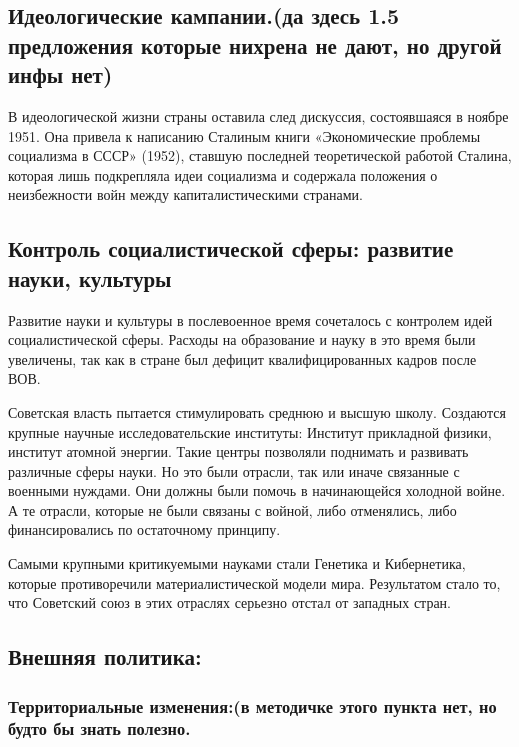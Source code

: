 \subsection{Идеологические кампании.(да здесь 1.5 предложения которые нихрена не дают, но другой инфы нет)}

В идеологической жизни страны оставила след дискуссия, состоявшаяся в ноябре 1951. Она привела к написанию Сталиным книги «Экономические проблемы социализма в СССР» (1952), ставшую последней теоретической работой Сталина, которая лишь подкрепляла идеи социализма и  содержала положения о неизбежности войн между капиталистическими странами.

\subsection{Контроль социалистической сферы: развитие науки, культуры}

Развитие науки и культуры в послевоенное время сочеталось с контролем идей социалистической сферы. Расходы на образование и науку в это время были увеличены, так как в стране был дефицит квалифицированных кадров после ВОВ. 

Советская власть пытается стимулировать среднюю и высшую школу. Создаются крупные научные исследовательские институты: Институт прикладной физики, институт атомной энергии. Такие центры позволяли поднимать и развивать различные сферы науки. Но это были отрасли, так или иначе связанные с военными нуждами. Они должны были помочь в начинающейся холодной войне. А те отрасли, которые не были связаны с войной, либо отменялись, либо финансировались по остаточному принципу. 

Самыми крупными критикуемыми науками стали Генетика и Кибернетика, которые противоречили материалистической модели мира. Результатом стало то, что Советский союз в этих отраслях серьезно отстал от западных стран.

\subsection{Внешняя политика:}

\subsubsection{\textbf{Территориальные изменения:(в методичке этого пункта нет, но будто бы знать полезно.}}


